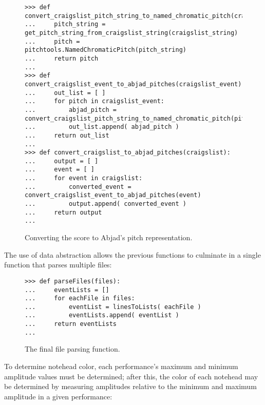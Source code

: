 \begin{figure}[H]
\begin{lstlisting}[basicstyle=\scriptsize\ttfamily, breaklines=True, tabsize=4, showtabs=false, showspaces=false]
>>> def convert_craigslist_pitch_string_to_named_chromatic_pitch(craigslist_string):
...     pitch_string = get_pitch_string_from_craigslist_string(craigslist_string)
...     pitch = pitchtools.NamedChromaticPitch(pitch_string)
...     return pitch
... 
>>> def convert_craigslist_event_to_abjad_pitches(craigslist_event):
...     out_list = [ ]
...     for pitch in craigslist_event:
...         abjad_pitch = convert_craigslist_pitch_string_to_named_chromatic_pitch(pitch)
...         out_list.append( abjad_pitch )
...     return out_list
... 
>>> def convert_craigslist_to_abjad_pitches(craigslist):
...     output = [ ]
...     event = [ ]
...     for event in craigslist:
...         converted_event = convert_craigslist_event_to_abjad_pitches(event)
...         output.append( converted_event )
...     return output
... \end{lstlisting}

\caption{Converting the score to Abjad's pitch representation. } 
\end{figure}

The use of data abstraction allows the previous functions to culminate in a single function that parses multiple files:

\begin{figure}[H]
\begin{lstlisting}[basicstyle=\scriptsize\ttfamily, breaklines=True, tabsize=4, showtabs=false, showspaces=false]
>>> def parseFiles(files):
...     eventLists = []
...     for eachFile in files:
...         eventList = linesToLists( eachFile )
...         eventLists.append( eventList )  
...     return eventLists
... \end{lstlisting}

\caption{The final file parsing function. } 
\end{figure}

To determine notehead color, each performance's maximum and minimum amplitude values must be determined; after this, the color of each notehead may be determined by measuring amplitudes relative to the minimum and maximum amplitude in a given performance:

